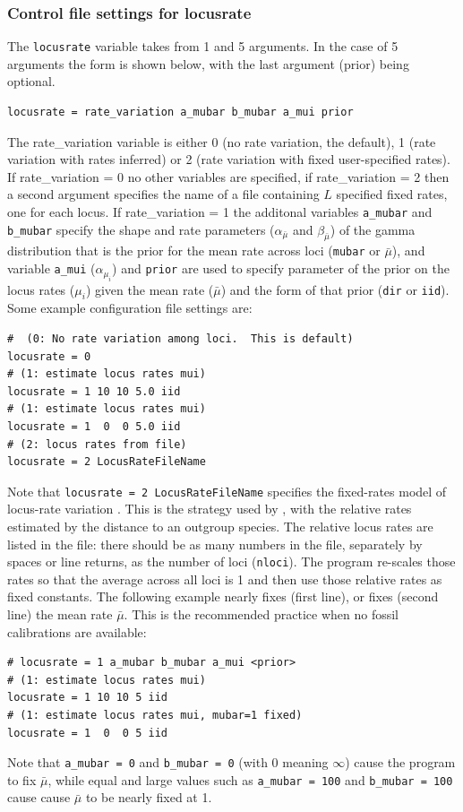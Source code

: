 \documentclass[a4paper]{book}
\numberwithin{equation}{section} \renewcommand{\baselinestretch}{0.55}
\begin{document}
\subsubsection{Control file settings for locusrate}
The \texttt{locusrate} variable takes from 1 and 5 arguments. In the
case of 5 arguments the form is shown below, with the last argument
(prior) being optional.
\begin{verbatim}
locusrate = rate_variation a_mubar b_mubar a_mui prior 
\end{verbatim}
The rate\_variation variable is either 0 (no rate variation, the
default), 1 (rate variation with rates inferred) or 2 (rate variation
with fixed user-specified rates).  If rate\_variation = 0 no other
variables are specified, if rate\_variation = 2 then a second argument
specifies the name of a file containing $L$ specified fixed rates, one
for each locus. If rate\_variation = 1 the additonal variables
\texttt{a\_mubar} and \texttt{b\_mubar} specify the shape and rate
parameters ($\alpha_{\bar{\mu}}$ and $\beta_{\bar{\mu}}$) of the gamma
distribution that is the prior for the mean rate across loci
(\texttt{mubar} or $\bar\mu$), and variable \texttt{a\_mui}
($\alpha_{\mu_i}$) and \texttt{prior} are used to specify parameter of
the prior on the locus rates ($\mu_i$) given the mean rate ($\bar\mu$)
and the form of that prior (\texttt{dir} or \texttt{iid}).  Some
example configuration file settings are:
\begin{verbatim}
#  (0: No rate variation among loci.  This is default)
locusrate = 0
# (1: estimate locus rates mui)
locusrate = 1 10 10 5.0 iid
# (1: estimate locus rates mui)
locusrate = 1  0  0 5.0 iid
# (2: locus rates from file)
locusrate = 2 LocusRateFileName    
\end{verbatim}
Note that \texttt{locusrate = 2 LocusRateFileName} specifies the
fixed-rates model of locus-rate variation \citep{Burgess2008}.  This
is the strategy used by \citet{Yang2002}, with the relative rates
estimated by the distance to an outgroup species.  The relative locus
rates are listed in the file: there should be as many numbers in the
file, separately by spaces or line returns, as the number of loci
(\texttt{nloci}).  The program re-scales those rates so that the
average across all loci is 1 and then use those relative rates as
fixed constants.  The following example nearly fixes (first line), or
fixes (second line) the mean rate $\bar{\mu}$.  This is the
recommended practice when no fossil calibrations are available:
\begin{verbatim}
# locusrate = 1 a_mubar b_mubar a_mui <prior>
# (1: estimate locus rates mui)
locusrate = 1 10 10 5 iid
# (1: estimate locus rates mui, mubar=1 fixed)
locusrate = 1  0  0 5 iid      
\end{verbatim}
Note that \texttt{a\_mubar = 0} and \texttt{b\_mubar = 0} (with 0
meaning $\infty$) cause the program to fix $\bar{\mu}$, while equal
and large values such as \texttt{a\_mubar = 100} and \texttt{b\_mubar
  = 100} cause cause $\bar\mu$ to be nearly fixed at 1.
\end{document}
